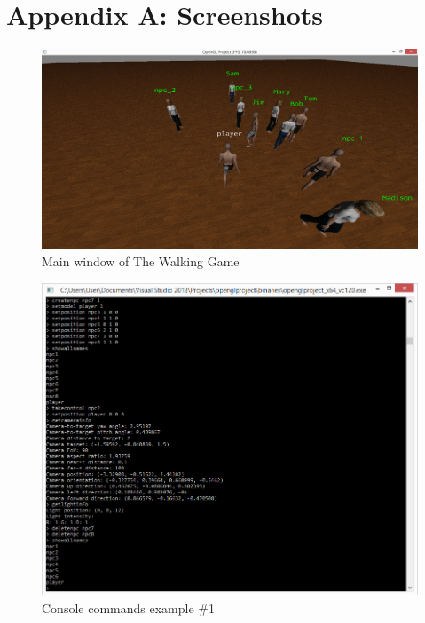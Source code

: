 \documentclass[12pt,letterpaper]{article}
\begin{document}
	\section*{Appendix A: Screenshots}
	\begin{figure}[h]
	\centering
	\includegraphics[width=\linewidth]{screenshot1}
	\caption{Main window of The Walking Game}
	\label{fig:screenshot1}
	\end{figure}
	\begin{figure}[h]
	\centering
	\includegraphics[width=\linewidth]{screenshot2}
	\caption{Console commands example \#1}
	\label{fig:screenshot2}
	\end{figure}
\end{document}
